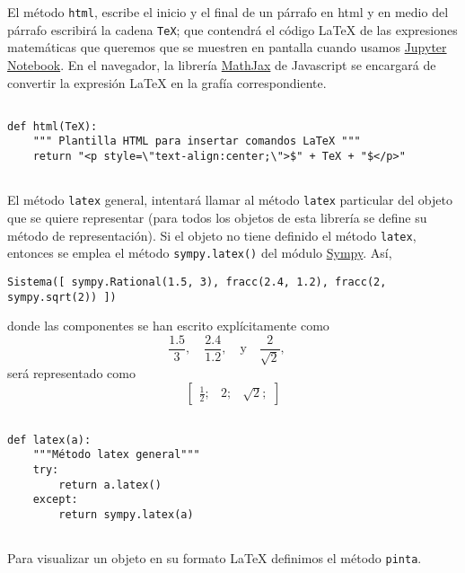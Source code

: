 \documentclass[11pt]{report}
\begin{document}
El método \texttt{html}, escribe el inicio y el final de un párrafo en html y
en medio del párrafo escribirá la cadena \texttt{TeX}; que contendrá el
código \LaTeX{} de las expresiones matemáticas que queremos que se
muestren en pantalla cuando usamos \href{https://jupyter.org/}{Jupyter Notebook}. En el navegador,
la librería \href{https://jupyter-notebook.readthedocs.io/en/stable/examples/Notebook/Typesetting\%20Equations.html}{MathJax} de Javascript se encargará de convertir la
expresión \LaTeX{} en la grafía correspondiente.

\begin{verbatim}

def html(TeX):
    """ Plantilla HTML para insertar comandos LaTeX """
    return "<p style=\"text-align:center;\">$" + TeX + "$</p>"
    
\end{verbatim}

El método \texttt{latex} general, intentará llamar al método \texttt{latex}
particular del objeto que se quiere representar (para todos los
objetos de esta librería se define su método de representación). Si el
objeto no tiene definido el método \texttt{latex}, entonces se emplea el
método \texttt{sympy.latex()} del módulo \href{https://www.sympy.org/en/index.html}{Sympy}. Así,

\begin{verbatim}
Sistema([ sympy.Rational(1.5, 3), fracc(2.4, 1.2), fracc(2, sympy.sqrt(2)) ]) 
\end{verbatim}
donde las componentes se han escrito explícitamente como 
\begin{displaymath}
\frac{1.5}{3},\quad
\frac{2.4}{1.2},\quad\text{y}\quad
\frac{2}{\sqrt{2}},\quad
\end{displaymath}
será representado como
$$\left[ \begin{array}{ccc}\frac{1}{2};& 2;& \sqrt{2};\end{array} \right]$$

\begin{verbatim}

def latex(a):
    """Método latex general"""
    try:
        return a.latex()
    except:
        return sympy.latex(a)
    
\end{verbatim}

Para visualizar un objeto en su formato \LaTeX{} definimos el método \texttt{pinta}.
\end{document}
